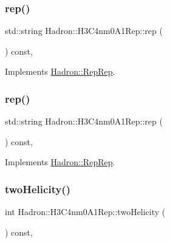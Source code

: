 \subsubsection{\texorpdfstring{rep()}{rep()}\hspace{0.1cm}{\footnotesize\ttfamily [4/5]}}
{\footnotesize\ttfamily std\+::string Hadron\+::\+H3\+C4nm0\+A1\+Rep\+::rep (\begin{DoxyParamCaption}{ }\end{DoxyParamCaption}) const\hspace{0.3cm}{\ttfamily [inline]}, {\ttfamily [virtual]}}



Implements \mbox{\hyperlink{structHadron_1_1RepRep_ab3213025f6de249f7095892109575fde}{Hadron\+::\+Rep\+Rep}}.

\mbox{\label{structHadron_1_1H3C4nm0A1Rep_a3634b28d2dcd2a2aab44846494b1f39c}} 
\subsubsection{\texorpdfstring{rep()}{rep()}\hspace{0.1cm}{\footnotesize\ttfamily [5/5]}}
{\footnotesize\ttfamily std\+::string Hadron\+::\+H3\+C4nm0\+A1\+Rep\+::rep (\begin{DoxyParamCaption}{ }\end{DoxyParamCaption}) const\hspace{0.3cm}{\ttfamily [inline]}, {\ttfamily [virtual]}}



Implements \mbox{\hyperlink{structHadron_1_1RepRep_ab3213025f6de249f7095892109575fde}{Hadron\+::\+Rep\+Rep}}.

\mbox{\label{structHadron_1_1H3C4nm0A1Rep_a98b5322646ba2129fe99f9b3c2a73b3f}} 
\subsubsection{\texorpdfstring{twoHelicity()}{twoHelicity()}\hspace{0.1cm}{\footnotesize\ttfamily [1/3]}}
{\footnotesize\ttfamily int Hadron\+::\+H3\+C4nm0\+A1\+Rep\+::two\+Helicity (\begin{DoxyParamCaption}{ }\end{DoxyParamCaption}) const\hspace{0.3cm}{\ttfamily [inline]}, {\ttfamily [virtual]}}

